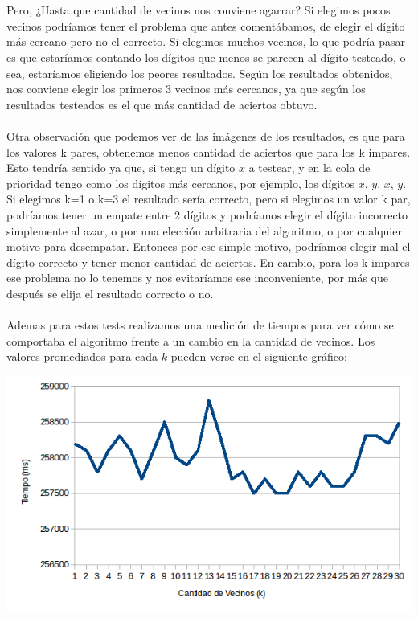 \\ \\
Pero, ¿Hasta que cantidad de vecinos nos conviene agarrar?
Si elegimos pocos vecinos podríamos tener el problema que antes comentábamos, de elegir el dígito más cercano pero no el correcto.
Si elegimos muchos vecinos, lo que podría pasar es que estaríamos contando los dígitos que menos se parecen al dígito testeado, o sea, estaríamos eligiendo los peores resultados.
Según los resultados obtenidos, nos conviene elegir los primeros 3 vecinos más cercanos, ya que según los resultados testeados es el que más cantidad de aciertos obtuvo.
\\ \\
Otra observación que podemos ver de las imágenes de los resultados, es que para los valores k pares, obtenemos menos cantidad de aciertos que para los k impares.
Esto tendría sentido ya que, si tengo un dígito $x$ a testear, y en la cola de prioridad tengo como los dígitos más cercanos, por ejemplo, los dígitos $x$, $y$, $x$, $y$.
Si elegimos k=1 o k=3 el resultado sería correcto, pero si elegimos un valor k par, podríamos tener un empate entre 2 dígitos y podríamos elegir el dígito incorrecto simplemente al azar, o por una elección arbitraria del algoritmo, o por cualquier motivo para desempatar. Entonces por ese simple motivo, podríamos elegir mal el dígito correcto y tener menor cantidad de aciertos. En cambio, para los k impares ese problema no lo tenemos y nos evitaríamos ese inconveniente, por más que después se elija el resultado correcto o no. 
\\ \\
Ademas para estos tests realizamos una medición de tiempos para ver cómo se comportaba el algoritmo frente a un cambio en la cantidad de vecinos. Los valores promediados para cada $k$ pueden verse en el siguiente gráfico:

\includegraphics[scale=0.55]{nuevosResultados/knn/knntemp.png}\\

